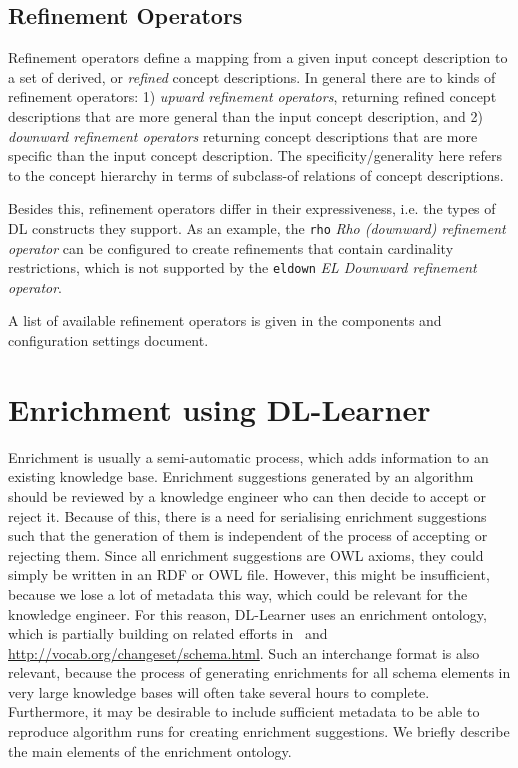 \documentclass[a4paper,12pt]{scrartcl}
\begin{document}
\subsection{Refinement Operators}
\label{sec:refinementoperators}

Refinement operators define a mapping from a given input concept description to a set of derived, or \emph{refined} concept descriptions.
In general there are to kinds of refinement operators: 1) \emph{upward refinement operators}, returning refined concept descriptions that are more general than the input concept description, and 2) \emph{downward refinement operators} returning concept descriptions that are more specific than the input concept description.
The specificity/generality here refers to the concept hierarchy in terms of subclass-of relations of concept descriptions.

Besides this, refinement operators differ in their expressiveness, i.e. the types of DL constructs they support.
As an example, the \texttt{rho} \emph{Rho (downward) refinement operator} can be configured to create refinements that contain cardinality restrictions, which is not supported by the \texttt{eldown} \emph{EL Downward refinement operator}.

A list of available refinement operators is given in the components and configuration settings document.

\section{Enrichment using DL-Learner}

Enrichment is usually a semi-automatic process, which adds information to an existing knowledge base.
Enrichment suggestions generated by an algorithm should be reviewed by a knowledge engineer who can then decide to accept or reject it.
Because of this, there is a need for serialising enrichment suggestions such that the generation of them is independent of the process of accepting or rejecting them.
Since all enrichment suggestions are OWL axioms, they could simply be written in an RDF or OWL file.
However, this might be insufficient, because we lose a lot of metadata this way, which could be relevant for the knowledge engineer. 
For this reason, DL-Learner uses an enrichment ontology, which is partially building on related efforts in~\cite{ontchange} and \url{http://vocab.org/changeset/schema.html}. 
Such an interchange format is also relevant, because the process of generating enrichments for all schema elements in very large knowledge bases will often take several hours to complete.
Furthermore, it may be desirable to include sufficient metadata to be able to reproduce algorithm runs for creating enrichment suggestions.
We briefly describe the main elements of the enrichment ontology.
\end{document}
